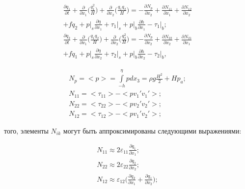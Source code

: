 \documentclass[14pt]{extreport}
\begin{document}
\begin{equation}\label{eq:shallow_water:17}
\begin{aligned}
\frac{\partial q_1}{\partial t} + \frac{\partial}{\partial x_1} \bigg(\frac{q_1^2}{H}\bigg)+\frac{\partial }{\partial x_2}\bigg(\frac{q_1 q_2}{H}\bigg) = -\frac{\partial N_p}{\partial x_2} + \frac{\partial N_{11}}{\partial x_1} + \frac{\partial N_{12}}{\partial x_2} \\+ fq_2 + p\bigg|_s \frac{\partial \eta}{\partial x_1} + \tau_1\bigg|_s+p\bigg|_b\frac{\partial h}{\partial x_1} - \tau_1\bigg|_b; \\
\frac{\partial q_2}{\partial t} + \frac{\partial}{\partial x_1} \bigg(\frac{q_1 q_2}{H}\bigg)+\frac{\partial }{\partial x_2}\bigg(\frac{q_2^2}{H}\bigg) = -\frac{\partial N_p}{\partial x_2} + \frac{\partial N_{22}}{\partial x_2} + \frac{\partial N_{21}}{\partial x_1} \\+ fq_1 + p\bigg|_s \frac{\partial \eta}{\partial x_2} + \tau_2\bigg|_s+p\bigg|_b\frac{\partial h}{\partial x_2} - \tau_2\bigg|_b,
\end{aligned}
\end{equation}


\begin{equation}\label{eq:shallow_water:18}
\begin{aligned}
N_p = <p> = \int\limits^\eta_{-h} pdx_3=\rho g \frac{H^2}{2} + Hp_a; \\
N_{11} = <\tau_{11}>-<pv_1'v_1'>; \\
N_{22} = <\tau_{22}>-<pv_2'v_2'>; \\
N_{12} = <\tau_{12}>-<pv_1'v_2'>;
\end{aligned}
\end{equation}

 того, элементы $N_{ik}$ могут быть аппроксимированы следующими выражениями:

\begin{equation}\label{eq:shallow_water:19}
\begin{aligned}
N_{11} \approx 2 \varepsilon_{11}\frac{\partial q_1}{\partial x_1}; \\
N_{22} \approx 2 \varepsilon_{22}\frac{\partial q_2}{\partial x_2}; \\
N_{12} \approx \varepsilon_{12}\bigg(\frac{\partial q_2}{\partial x_1}+\frac{\partial q_1}{\partial x_2}\bigg);
\end{aligned}
\end{equation}
\end{document}
